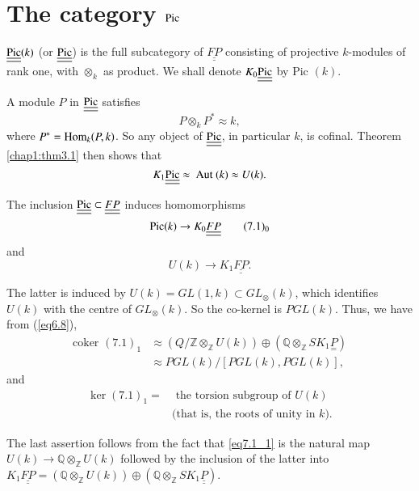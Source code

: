 \section{The category
  \underline{\underline{$\operatorname{Pic}$}}}\label{chap1:sec7}%

$\underline{\underline{\operatorname{Pic}}} (k)$ (or $\underline{\underline{\operatorname{Pic}}}$)
is the full subcategory of $\underline{\underline{FP}}$ consisting of projective
$k$-modules of rank one, with $\otimes_k$ as product. We shall denote
$K_{0} \underline{\underline{\operatorname{Pic}}}$ by Pic $(k)$.   

A module $P$ in $\underline{\underline{\operatorname{Pic}}}$ satisfies
$$
P \otimes_k P^{*} \approx k,
$$ 
where $P^*= \operatorname{Hom}_k (P,k)$. So any object of
$\underline{\underline{\operatorname{Pic}}}$, in particular $k$, is cofinal. Theorem
\ref{chap1:thm3.1} then shows that  
$$
K_1 \underline{\underline{\operatorname{Pic}}} \approx \text{ Aut } (k) \approx U(k).
$$

The inclusion $\underline{\underline{\operatorname{Pic}}} \subset
\underline{\underline{FP}}$ induces 
homomorphisms  
\begin{equation*}
\operatorname{Pic} (k) \to K_0 \underline{\underline{FP}} \tag*{$(7.1)_0$}\label{eq7.1_0}
\end{equation*}
and\pageoriginale 
\begin{equation*}
U(k) \to K_1 \underline{\underline{FP}}. \tag*{$(7.1)_1$}\label{eq7.1_1}
\end{equation*}

The latter is induced  by $U(k)= GL(1,k) \subset GL_\otimes (k)$,
which identifies $U(k)$ with the centre of $GL_\otimes (k)$. So the
co-kernel is $PGL(k)$. Thus, we have from (\ref{eq6.8}), 
\begin{align*}
\text{coker } (7.1)_1  &\approx ( Q / \mathbb{Z} \otimes_\mathbb{Z} U(k))
\oplus (\mathbb{Q} \otimes_\mathbb{Z} SK_1 \underset{=}{P})
\tag{7.2}\label{eq7.2}\\   
&\approx PGL(k) / [PGL(k), PGL(k)],
  \end{align*}  
  and 
  \begin{align*}
\ker (7.1)_1 = & \text{ the torsion subgroup of } U(k) \\
& \text{(that is, the roots of unity in $k$)}.
  \end{align*}  
  
  The last assertion follows from the fact that \ref{eq7.1_1} is the natural
  map $U(k) \to \mathbb{Q} \otimes_\mathbb{Z} U(k)$ followed  by the
  inclusion   of the latter into $K_1 \underline{\underline{FP}} = (\mathbb{Q}
  \otimes_\mathbb{Z} U(k))   \oplus (\mathbb{Q} \otimes_\mathbb{Z} SK_1
  \underline{\underline{P}})$.   

